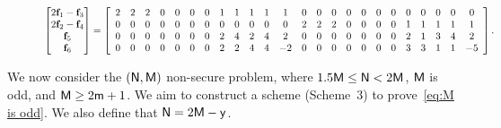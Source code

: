 \documentclass[conference,letterpaper]{IEEEtran}
\begin{document}
\begin{figure} [ht]
\begin{equation} \label{eq:scheme 3 transmission of first class}
\begin{aligned}
\begin{bmatrix}
 2{{\bf f}}_1 - {{\bf f}}_3 \\ 
 2{{\bf f}}_2 - {{\bf f}}_4 \\ 
 {{\bf f}}_5 \\ 
 {{\bf f}}_6 
\end{bmatrix} = 
 \left[
\begin{array}{cccccccccccccccccccccccc}
 2 & 2 & 2 & 0 & 0 & 0 & 0 & 1 & 1 & 1 & 1 & 1 & 0 & 0 & 0 & 0 & 0 & 0 & 0 & 0 & 0 & 0 & 0 & 0 \\
 0 & 0 & 0 & 0 & 0 & 0 & 0 & 0 & 0 & 0 & 0 & 0 & 2 & 2 & 2 & 0 & 0 & 0 & 0 & 1 & 1 & 1 & 1 & 1 \\
 0 & 0 & 0 & 0 & 0 & 0 & 0 & 2 & 4 & 2 & 4 & 2 & 0 & 0 & 0 & 0 & 0 & 0 & 0 & 2 & 1 & 3 & 4 & 2 \\
 0 & 0 & 0 & 0 & 0 & 0 & 0 & 2 & 2 & 4 & 4 & -2 & 0 & 0 & 0 & 0 & 0 & 0 & 0 & 3 & 3 & 1 & 1 & -5
\end{array}
 \right].
\end{aligned}
\end{equation}

\end{figure}
\fi
We now consider the $({\sf N}, {\sf M})$ non-secure problem, where $1.5 {\sf M} \leq {\sf N} < 2{\sf M}$, ${\sf M}$ is odd, and ${\sf M} \geq 2{\sf m} + 1$. We aim to construct a scheme (Scheme~3) to prove~\eqref{eq:M is odd}.
We also define that ${\sf N}=2{\sf M}-{\sf y}$. 
\end{document}
